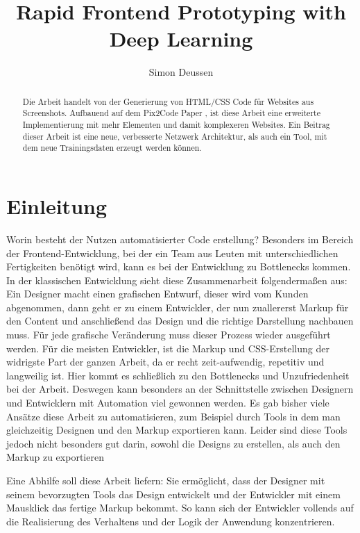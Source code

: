 \documentclass[pdftex,a4paper,halfparskip, article]{scrartcl}
\title{Rapid Frontend Prototyping with Deep Learning} %
\author{Simon Deussen}	%
\begin{document}
\maketitle	

\begin{abstract}
Die Arbeit handelt von der Generierung von HTML/CSS Code für Websites aus Screenshots. Aufbauend auf dem Pix2Code Paper \cite{Beltramelli17}, ist diese Arbeit eine erweiterte Implementierung mit mehr Elementen und damit komplexeren Websites. Ein Beitrag dieser Arbeit ist eine neue, verbesserte Netzwerk Architektur, als auch ein Tool, mit dem neue Trainingsdaten erzeugt werden können.
\end{abstract}


\tableofcontents	%
\section{Einleitung} 

Worin besteht der Nutzen automatisierter Code erstellung? 
Besonders im Bereich der Frontend-Entwicklung, bei der ein Team aus Leuten mit unterschiedlichen Fertigkeiten benötigt wird, kann es bei der Entwicklung zu Bottlenecks kommen. In der klassischen Entwicklung sieht diese Zusammenarbeit folgendermaßen aus: \\
Ein Designer macht einen grafischen Entwurf, dieser wird vom Kunden abgenommen, dann geht er zu einem Entwickler, der nun zuallererst Markup für den Content und anschließend das Design und die richtige Darstellung nachbauen muss. Für jede grafische Veränderung muss dieser Prozess wieder ausgeführt werden. Für die meisten Entwickler, ist die Markup und CSS-Erstellung der widrigste Part der ganzen Arbeit, da er recht zeit-aufwendig, repetitiv und langweilig ist.
Hier kommt es schließlich zu den Bottlenecks und Unzufriedenheit bei der Arbeit. Deswegen kann besonders an der Schnittstelle zwischen Designern und Entwicklern mit Automation viel gewonnen werden. Es gab bisher viele Ansätze diese Arbeit zu automatisieren, zum Beispiel durch Tools in dem man gleichzeitig Designen und den Markup exportieren kann. Leider sind diese Tools jedoch nicht besonders gut darin, sowohl die Designs zu erstellen, als auch den Markup zu exportieren

Eine Abhilfe soll diese Arbeit liefern: Sie ermöglicht, dass der Designer mit seinem bevorzugten Tools das Design entwickelt und der Entwickler mit einem Mausklick das fertige Markup bekommt. So kann sich der Entwickler vollends auf die Realisierung des Verhaltens und der Logik der Anwendung konzentrieren. 
\end{document}
